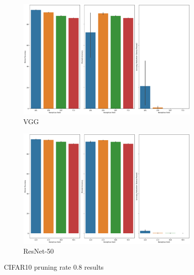 \begin{figure}[h]
 \centering
     \begin{subfigure}[b]{\columnwidth}
    \includegraphics[width=1.1\columnwidth]{images/Supplementary_material/cifar10_vgg19_pruning_results_0.8.png}
    \caption{VGG}
    \label{subfig:vgg19CIfar10PR0.8}
     \end{subfigure}
      \hfill
     \begin{subfigure}[b]{\columnwidth}
    \includegraphics[width=1.1\columnwidth]{images/Supplementary_material/cifar10_resnet50_pruning_results_0.8.png}
    \caption{ResNet-50}
    \label{subfig:resenet50CIfar10PR0.8}
     \end{subfigure}
     \caption{ CIFAR10 pruning rate 0.8 results}
    \label{fig:pr_0.8_CIFAR10}
\end{figure}

